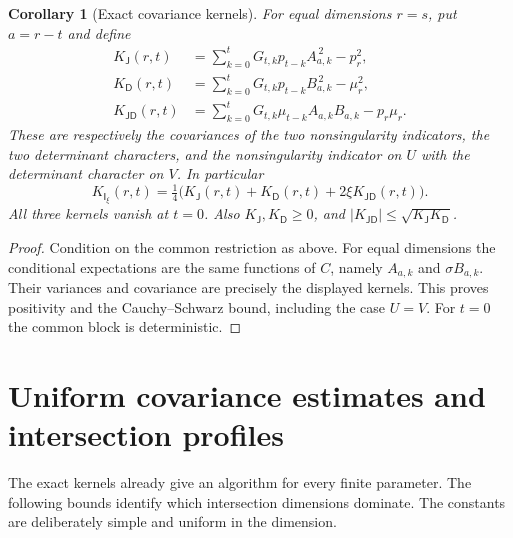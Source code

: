 \documentclass[11pt,a4paper]{article}
\newtheorem{corollary}[theorem]{Corollary}
\theoremstyle{definition}
\theoremstyle{remark}
\newcommand{\J}{\mathsf J}
\newcommand{\D}{\mathsf D}
\newcommand{\I}{\mathsf I}
\begin{document}
\begin{corollary}[Exact covariance kernels]\label{cor:kernels}
For equal dimensions $r=s$, put $a=r-t$ and define
\begin{align}
 K_\J(r,t)&=\sum_{k=0}^{t}G_{t,k}p_{t-k}A_{a,k}^{\,2}-p_r^2,
 \label{eq:KJ}\\
 K_\D(r,t)&=\sum_{k=0}^{t}G_{t,k}p_{t-k}B_{a,k}^{\,2}-\mu_r^2,
 \label{eq:KD}\\
 K_{\J\D}(r,t)&=\sum_{k=0}^{t}G_{t,k}\mu_{t-k}A_{a,k}B_{a,k}-p_r\mu_r.
 \label{eq:KJD}
\end{align}
These are respectively the covariances of the two nonsingularity indicators,
the two determinant characters, and the nonsingularity indicator on $U$
with the determinant character on $V$. In particular
\begin{equation}\label{eq:KI}
 K_{\I_\xi}(r,t)=\tfrac14\bigl(K_\J(r,t)+K_\D(r,t)
                          +2\xi K_{\J\D}(r,t)\bigr).
\end{equation}
All three kernels vanish at $t=0$. Also $K_\J,K_\D\ge0$, and
$|K_{\J\D}|\le\sqrt{K_\J K_\D}$.
\end{corollary}
\begin{proof}
Condition on the common restriction as above. For equal dimensions the
conditional expectations are the same functions of $C$, namely
$A_{a,k}$ and $\sigma B_{a,k}$. Their variances and covariance are precisely
the displayed kernels. This proves positivity and the Cauchy--Schwarz
bound, including the case $U=V$. For $t=0$ the common block is deterministic.
\end{proof}

\section{Uniform covariance estimates and intersection profiles}
\label{sec:bounds}
The exact kernels already give an algorithm for every finite parameter.
The following bounds identify which intersection dimensions dominate.
The constants are deliberately simple and uniform in the dimension.
\end{document}
